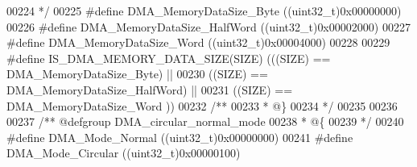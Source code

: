 \begin{DoxyCode}
00224 \textcolor{comment}{  */}
00225 \textcolor{preprocessor}{#}\textcolor{preprocessor}{define} \textcolor{preprocessor}{DMA\_MemoryDataSize\_Byte}           \textcolor{preprocessor}{(}\textcolor{preprocessor}{(}\textcolor{preprocessor}{uint32\_t}\textcolor{preprocessor}{)}0x00000000\textcolor{preprocessor}{)}
00226 \textcolor{preprocessor}{#}\textcolor{preprocessor}{define} \textcolor{preprocessor}{DMA\_MemoryDataSize\_HalfWord}       \textcolor{preprocessor}{(}\textcolor{preprocessor}{(}\textcolor{preprocessor}{uint32\_t}\textcolor{preprocessor}{)}0x00002000\textcolor{preprocessor}{)}
00227 \textcolor{preprocessor}{#}\textcolor{preprocessor}{define} \textcolor{preprocessor}{DMA\_MemoryDataSize\_Word}           \textcolor{preprocessor}{(}\textcolor{preprocessor}{(}\textcolor{preprocessor}{uint32\_t}\textcolor{preprocessor}{)}0x00004000\textcolor{preprocessor}{)}
00228 
00229 \textcolor{preprocessor}{#}\textcolor{preprocessor}{define} \textcolor{preprocessor}{IS\_DMA\_MEMORY\_DATA\_SIZE}\textcolor{preprocessor}{(}\textcolor{preprocessor}{SIZE}\textcolor{preprocessor}{)} \textcolor{preprocessor}{(}\textcolor{preprocessor}{(}\textcolor{preprocessor}{(}\textcolor{preprocessor}{SIZE}\textcolor{preprocessor}{)} \textcolor{preprocessor}{==} DMA_MemoryDataSize_Byte\textcolor{preprocessor}{)}  \textcolor{preprocessor}{||}
00230                                        \textcolor{preprocessor}{(}\textcolor{preprocessor}{(}\textcolor{preprocessor}{SIZE}\textcolor{preprocessor}{)} \textcolor{preprocessor}{==} 
      DMA_MemoryDataSize_HalfWord\textcolor{preprocessor}{)} \textcolor{preprocessor}{||}
00231                                        \textcolor{preprocessor}{(}\textcolor{preprocessor}{(}\textcolor{preprocessor}{SIZE}\textcolor{preprocessor}{)} \textcolor{preprocessor}{==} DMA_MemoryDataSize_Word \textcolor{preprocessor}{)}\textcolor{preprocessor}{)}
00232 \textcolor{comment}{/**}
00233 \textcolor{comment}{  * @\}}
00234 \textcolor{comment}{  */}
00235 
00236 
00237 \textcolor{comment}{/** @defgroup DMA\_circular\_normal\_mode }
00238 \textcolor{comment}{  * @\{}
00239 \textcolor{comment}{  */}
00240 \textcolor{preprocessor}{#}\textcolor{preprocessor}{define} \textcolor{preprocessor}{DMA\_Mode\_Normal}                   \textcolor{preprocessor}{(}\textcolor{preprocessor}{(}\textcolor{preprocessor}{uint32\_t}\textcolor{preprocessor}{)}0x00000000\textcolor{preprocessor}{)}
00241 \textcolor{preprocessor}{#}\textcolor{preprocessor}{define} \textcolor{preprocessor}{DMA\_Mode\_Circular}                 \textcolor{preprocessor}{(}\textcolor{preprocessor}{(}\textcolor{preprocessor}{uint32\_t}\textcolor{preprocessor}{)}0x00000100\textcolor{preprocessor}{)}

\end{DoxyCode}

